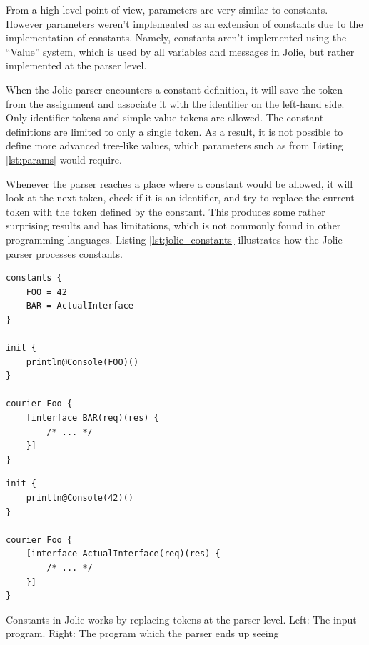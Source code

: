 From a high-level point of view, parameters are very similar to constants.
However parameters weren't implemented as an extension of constants due to the
implementation of constants. Namely, constants aren't implemented using the
``Value'' system, which is used by all variables and messages in Jolie, but
rather implemented at the parser level.

When the Jolie parser encounters a constant definition, it will save the token
from the assignment and associate it with the identifier on the left-hand side.
Only identifier tokens and simple value tokens are allowed. The constant
definitions are limited to only a single token. As a result, it is not possible
to define more advanced tree-like values, which parameters such as
 from Listing \ref{lst:params} would require.

Whenever the parser reaches a place where a constant would be allowed, it will
look at the next token, check if it is an identifier, and try to replace the
current token with the token defined by the constant. This produces some rather
surprising results and has limitations, which is not commonly found in other
programming languages.  Listing \ref{lst:jolie_constants} illustrates how the
Jolie parser processes constants.

\begin{listing}[H]
\begin{multicols}{2}

\begin{verbatim}
constants {
    FOO = 42
    BAR = ActualInterface
}

init {
    println@Console(FOO)()
}

courier Foo {
    [interface BAR(req)(res) {
        /* ... */
    }]
}
\end{verbatim}

\columnbreak

\begin{verbatim}
init {
    println@Console(42)()
}

courier Foo {
    [interface ActualInterface(req)(res) {
        /* ... */
    }]
}
\end{verbatim}

\end{multicols}

\caption{Constants in Jolie works by replacing tokens at the parser level. Left:
    The input program. Right: The program which the parser ends up seeing}

\label{lst:jolie_constants}

\end{listing}

